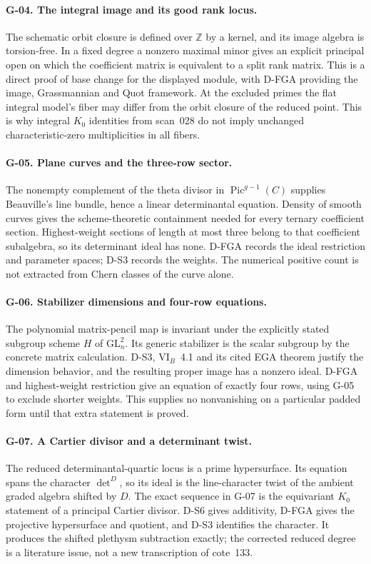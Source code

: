 \documentclass[11pt,a4paper]{article}
\theoremstyle{definition}\newtheorem{definition}{Definition}
\begin{document}
\paragraph{G-04. The integral image and its good rank locus.}
The schematic orbit closure is defined over $\mathbb Z$ by a kernel, and its image algebra is torsion-free. In a fixed degree a nonzero maximal minor gives an explicit principal open on which the coefficient matrix is equivalent to a split rank matrix. This is a direct proof of base change for the displayed module, with D-FGA providing the image, Grassmannian and Quot framework. At the excluded primes the flat integral model's fiber may differ from the orbit closure of the reduced point. This is why integral $K_0$ identities from scan~028 do not imply unchanged characteristic-zero multiplicities in all fibers.

\paragraph{G-05. Plane curves and the three-row sector.}
The nonempty complement of the theta divisor in $\operatorname{Pic}^{g-1}(C)$ supplies Beauville's line bundle, hence a linear determinantal equation. Density of smooth curves gives the scheme-theoretic containment needed for every ternary coefficient section. Highest-weight sections of length at most three belong to that coefficient subalgebra, so its determinant ideal has none. D-FGA records the ideal restriction and parameter spaces; D-S3 records the weights. The numerical positive count is not extracted from Chern classes of the curve alone.

\paragraph{G-06. Stabilizer dimensions and four-row equations.}
The polynomial matrix-pencil map is invariant under the explicitly stated subgroup scheme $H$ of $\mathrm{GL}_n^2$. Its generic stabilizer is the scalar subgroup by the concrete matrix calculation. D-S3, VI$_B$~4.1 and its cited EGA theorem justify the dimension behavior, and the resulting proper image has a nonzero ideal. D-FGA and highest-weight restriction give an equation of exactly four rows, using G-05 to exclude shorter weights. This supplies no nonvanishing on a particular padded form until that extra statement is proved.

\paragraph{G-07. A Cartier divisor and a determinant twist.}
The reduced determinantal-quartic locus is a prime hypersurface. Its equation spans the character $\det^D$, so its ideal is the line-character twist of the ambient graded algebra shifted by $D$. The exact sequence in G-07 is the equivariant $K_0$ statement of a principal Cartier divisor. D-S6 gives additivity, D-FGA gives the projective hypersurface and quotient, and D-S3 identifies the character. It produces the shifted plethysm subtraction exactly; the corrected reduced degree is a literature issue, not a new transcription of cote~133.
\end{document}

